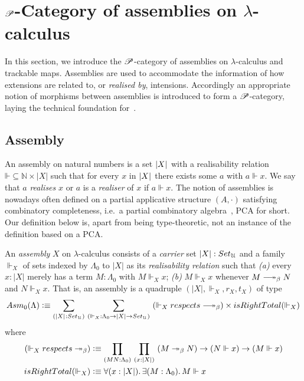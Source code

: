 \documentclass[a4paper,UKenglish,numberwithinsect,cleveref,thm-restate]{lipics-v2021}
\numberwithin{equation}{section}
\theoremstyle{plain}
\begin{document}
\section{\texorpdfstring{$\mathscr{P}$}{P}-Category of assemblies on \texorpdfstring{$\lambda$}{λ}-calculus}\label{sec:assemblies}

In this section, we introduce the $\mathscr{P}$-category of assemblies on $\lambda$-calculus and trackable maps.
Assemblies are used to accommodate the information of how extensions are related to, or \emph{realised by}, intensions. Accordingly an appropriate notion of morphisms between assemblies is introduced to form a $\mathscr{P}$-category, laying
the technical foundation for~.


\subsection{Assembly}
An assembly on natural numbers is a set $\mathopen{}\left|X\right|_{}^{}\mathclose{}$ with a realisability relation $\mathord{\Vdash} \subseteq \mathbb{N} \times |X|$ such that for every $x$ in $\mathopen{}\left|X\right|_{}^{}\mathclose{}$ there exists some $a$ with $a \Vdash x$.
We say that $a$ \emph{realises} $x$ or $a$ is a \emph{realiser} of $x$ if $a \Vdash x$.
The notion of assemblies is nowadays often defined on a partial applicative structure $(A, \cdot)$ satisfying combinatory completeness, i.e.\ a partial combinatory algebra~\cite{Oosten2008}, PCA for short.
Our definition below is, apart from being type-theoretic, not an instance of the definition based on a PCA.
\begin{definition}\label{def:assembly}
  An \emph{assembly} $X$ on $\lambda$-calculus consists of a \emph{carrier} set $|X| : \setU$ and a family ${\Vdash_X}$ of sets indexed by $\Lambda_0$ to $|X|$ as its \emph{realisability relation} such that
  \emph{(a)} every $x : |X|$ merely has a term $M : \Lambda_0$ with $M \Vdash_X x$;
  \emph{(b)} $M \Vdash_X x$ whenever $M \reduce N$ and $N \Vdash_X x$.
  That is, an assembly is a quadruple $(|X|, \Vdash_X, r_X, t_X)$ of type
  \[
    \Asm_0(\Lambda) \defeq \sm{\bproj{X} : {\setU}}{\mathord{\Vdash_X}:\Lambda_0 \to |X| \to \setU} 
    \left(\mathord{\Vdash_X}\;\mathsf{respects}\;\mathord{\reduce}\right)
      \times \mathsf{isRightTotal}({\Vdash_X})
  \]
  where
  \begin{align}
    \left(\mathord{\Vdash_X}\;\mathsf{respects}\;\mathord{\twoheadrightarrow_\beta}\right) & \defeq\prd{M N : \Lambda_0}{x : |X|} \left(M \twoheadrightarrow_ \beta N\right) \to \left(N \Vdash x\right) \to \left(M \Vdash x\right) \label{def:respect-reduction} \\      
    \mathsf{isRightTotal}(\Vdash_X) & \defeq \fall{x : |X|}\exis{M : \Lambda_0} M \Vdash x
    \label{def:right-total}
  \end{align}
\end{definition}
\end{document}
